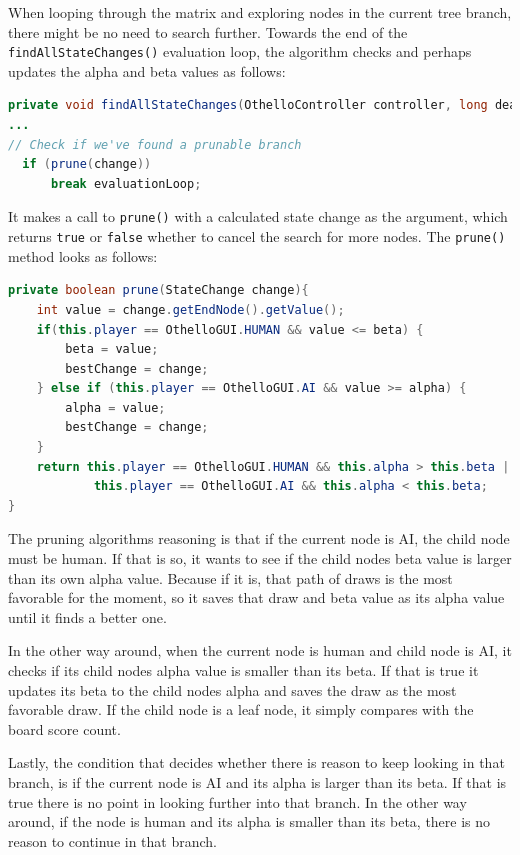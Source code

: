\documentclass{article}
\begin{document}
When looping through the matrix and exploring nodes in the current tree branch, there might be no need to
search further. Towards the end of the \verb|findAllStateChanges()| evaluation loop, the algorithm checks
and perhaps updates the alpha and beta values as follows:

\begin{lstlisting}[language=Java]
private void findAllStateChanges(OthelloController controller, long deadline){
...
// Check if we've found a prunable branch
  if (prune(change))
      break evaluationLoop;
\end{lstlisting}

It makes a call to \verb|prune()| with a calculated state change as the argument,
which returns \verb|true| or \verb|false| whether to cancel the search for more nodes.
The \verb|prune()| method looks as follows:

\newpage
\begin{lstlisting}[language=Java]
private boolean prune(StateChange change){
    int value = change.getEndNode().getValue();
    if(this.player == OthelloGUI.HUMAN && value <= beta) {
        beta = value;
        bestChange = change;
    } else if (this.player == OthelloGUI.AI && value >= alpha) {
        alpha = value;
        bestChange = change;
    }
    return this.player == OthelloGUI.HUMAN && this.alpha > this.beta ||
            this.player == OthelloGUI.AI && this.alpha < this.beta;
}
\end{lstlisting}

The pruning algorithms reasoning is that if the current node is AI, the child node
must be human. If that is so, it wants to see if the child nodes beta value is larger
than its own alpha value. Because if it is, that path of draws is the most favorable
for the moment, so it saves that draw and beta value as its alpha value until it finds a better one.

In the other way around, when the current node is human and child node is AI, it
checks if its child nodes alpha value is smaller than its beta.
If that is true it updates its beta to the child nodes alpha and saves the draw
as the most favorable draw. If the child node is a leaf node, it simply compares with the board score count.

Lastly, the condition that decides whether there is reason to keep looking in that branch,
is if the current node is AI and its alpha is larger than its beta. If that is true there is
no point in looking further into that branch.
In the other way around, if the node is human and its alpha is smaller than its beta, there is
no reason to continue in that branch.
\end{document}
